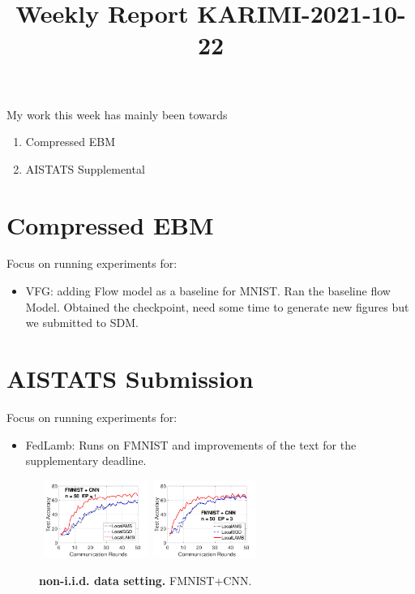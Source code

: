 \documentclass{article}
\begin{document}
\title{Weekly Report KARIMI-2021-10-22}


\date{}
\maketitle

\vspace{-0.5in}


My work this week has mainly been towards
\begin{enumerate}
\item Compressed EBM
\item AISTATS Supplemental
\end{enumerate}

\section{Compressed EBM}
Focus on running experiments for:
\begin{itemize}
\item VFG: adding Flow model as a baseline for MNIST. Ran the baseline flow Model. Obtained the checkpoint, need some time to generate new figures but we submitted to SDM.
\end{itemize}



\section{AISTATS Submission}
Focus on running experiments for:
\begin{itemize}
\item FedLamb: Runs on FMNIST and improvements of the text for the supplementary deadline.
\end{itemize}


 \begin{figure}[H]
    \begin{center}
        \mbox{
        \hspace{-0.05in}\includegraphics[width=0.3\textwidth]{new_fmnist_mnist_fig/fmnist_testerror_cnn_ep1_iid0.pdf}
        \hspace{-0.1in}\includegraphics[width=0.3\textwidth]{new_fmnist_mnist_fig/fmnist_testerror_cnn_ep3_iid0.pdf}
        }
    \end{center}
    \vspace{0.05in}
	\caption{\textbf{non-i.i.d. data setting.} FMNIST+CNN.}
	\label{fig:noniid}
	\vspace{-0.1in}
\end{figure}
  




\end{document}
